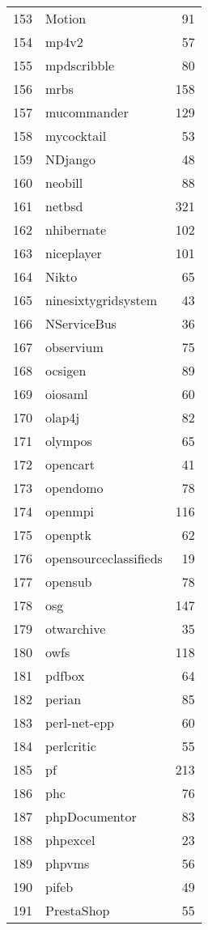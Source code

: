 \begin{table}[ht]
\begin{tabular}{rlr}
  153 & Motion &  91 \\ 
  154 & mp4v2 &  57 \\ 
  155 & mpdscribble &  80 \\ 
  156 & mrbs & 158 \\ 
  157 & mucommander & 129 \\ 
  158 & mycocktail &  53 \\ 
  159 & NDjango &  48 \\ 
  160 & neobill &  88 \\ 
  161 & netbsd & 321 \\ 
  162 & nhibernate & 102 \\ 
  163 & niceplayer & 101 \\ 
  164 & Nikto &  65 \\ 
  165 & ninesixtygridsystem &  43 \\ 
  166 & NServiceBus &  36 \\ 
  167 & observium &  75 \\ 
  168 & ocsigen &  89 \\ 
  169 & oiosaml &  60 \\ 
  170 & olap4j &  82 \\ 
  171 & olympos &  65 \\ 
  172 & opencart &  41 \\ 
  173 & opendomo &  78 \\ 
  174 & openmpi & 116 \\ 
  175 & openptk &  62 \\ 
  176 & opensourceclassifieds &  19 \\ 
  177 & opensub &  78 \\ 
  178 & osg & 147 \\ 
  179 & otwarchive &  35 \\ 
  180 & owfs & 118 \\ 
  181 & pdfbox &  64 \\ 
  182 & perian &  85 \\ 
  183 & perl-net-epp &  60 \\ 
  184 & perlcritic &  55 \\ 
  185 & pf & 213 \\ 
  186 & phc &  76 \\ 
  187 & phpDocumentor &  83 \\ 
  188 & phpexcel &  23 \\ 
  189 & phpvms &  56 \\ 
  190 & pifeb &  49 \\ 
  191 & PrestaShop &  55 \\ 

\end{tabular}
\end{table}
